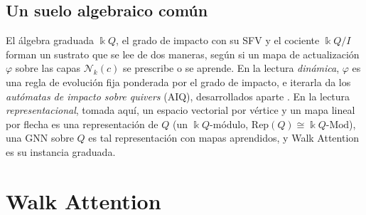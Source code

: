 \documentclass[runningheads]{llncs}
\newcommand{\kk}{\Bbbk}
\newcommand{\kQ}{\kk Q}
\begin{document}
\subsection{Un suelo algebraico común}\label{sec:ground}

El álgebra graduada $\kQ$, el grado de impacto con su SFV y el cociente
$\kQ/I$ forman un sustrato que se lee de dos maneras, según si un mapa de
actualización $\varphi$ sobre las capas $\mathcal{N}_k(c)$ se prescribe o se
aprende. En la lectura \emph{dinámica}, $\varphi$ es una regla de evolución
fija ponderada por el grado de impacto, e iterarla da los \emph{autómatas de
impacto sobre quivers} (AIQ), desarrollados aparte
\cite{zainea2026aiq,ibanez2025casimulations}. En la lectura
\emph{representacional}, tomada aquí, un espacio vectorial por vértice y un
mapa lineal por flecha es una representación de $Q$ (un $\kQ$-módulo,
$\mathrm{Rep}(Q)\cong\kQ\text{-}\mathrm{Mod}$), una GNN sobre $Q$ es tal
representación con mapas aprendidos, y Walk Attention es su instancia
graduada.

\section{Walk Attention}\label{sec:model}
\end{document}
